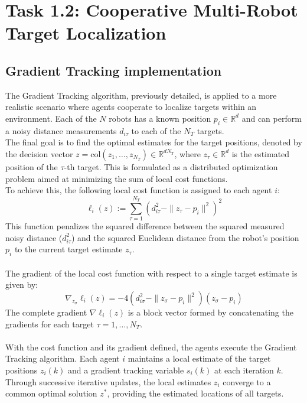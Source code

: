 \documentclass[a4paper,11pt,oneside]{book}
\begin{document}
\section{Task 1.2: Cooperative Multi-Robot Target Localization}

\subsection{Gradient Tracking implementation}
The Gradient Tracking algorithm, previously detailed, is applied to a more realistic scenario where agents cooperate to localize targets within an environment. Each of the $N$ robots has a known position $p_i \in \mathbb{R}^d$ and can perform a noisy distance measurements $d_{i\tau}$ to each of the $N_T$ targets.
\\
The final goal is to find the optimal estimates for the target positions, denoted by the decision vector $z = \text{col}(z_1, \dots, z_{N_T}) \in \mathbb{R}^{dN_T}$, where $z_\tau \in \mathbb{R}^d$ is the estimated position of the $\tau$-th target. 
This is formulated as a distributed optimization problem aimed at minimizing the sum of local cost functions.
\\
To achieve this, the following local cost function is assigned to each agent $i$:
\[
\ell_i(z) := \sum_{\tau=1}^{N_T} \left(d_{i\tau}^2 - \|z_\tau - p_i\|^2\right)^2
\]
This function penalizes the squared difference between the squared measured noisy distance ($d_{i\tau}^2$) and the squared Euclidean distance from the robot's position $p_i$ to the current target estimate $z_\tau$.
\\\\
The gradient of the local cost function with respect to a single target estimate is given by:
\[
\nabla_{z_\sigma} \ell_i(z) = -4 \left(d_{i\sigma}^2 - \|z_\sigma - p_i\|^2\right) (z_\sigma - p_i)
\]
The complete gradient $\nabla \ell_i(z)$ is a block vector formed by concatenating the gradients for each target $\tau=1, \dots, N_T$.
\\\\
With the cost function and its gradient defined, the agents execute the Gradient Tracking algorithm. Each agent $i$ maintains a local estimate of the target positions $z_i(k)$ and a gradient tracking variable $s_i(k)$ at each iteration $k$. Through successive iterative updates, the local estimates $z_i$ converge to a common optimal solution $z^*$, providing the estimated locations of all targets.
\end{document}
